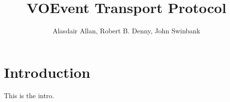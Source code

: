 \documentclass[a4paper,11pt]{ivoa}
\title{VOEvent Transport Protocol}
\author{Alasdair Allan, Robert B. Denny, John Swinbank}
\begin{document}
\maketitle

\section{Introduction}
This is the intro.
\end{document}
